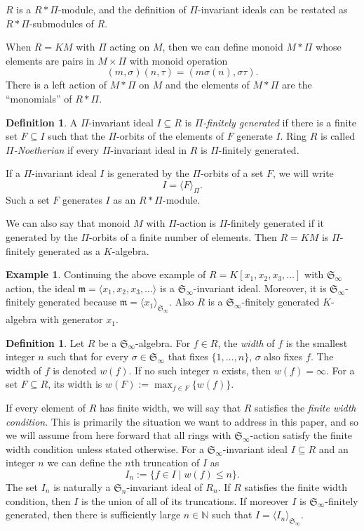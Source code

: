 \documentclass{amsart}
\theoremstyle{definition}
\newtheorem{definition}[theorem]{Definition}
\newtheorem{example}[theorem]{Example}
\theoremstyle{remark}
\numberwithin{equation}{section}
\newcommand{\B}[1]{\mathbb #1}
\newcommand{\F}[1]{\mathfrak #1}
\newcommand{\ideal}[1]{\langle #1 \rangle}
\newcommand{\SymN}{\F S_\infty}
\newcommand{\mon}{M}
\newcommand{\Sym}{\F S_\infty}
\begin{document}
$R$ is a $R*\Pi$-module, and the definition of $\Pi$-invariant ideals can be restated as $R*\Pi$-submodules of $R$.

When $R = K\mon$ with $\Pi$ acting on $\mon$, then we can define monoid $\mon *\Pi$ whose elements are pairs in $\mon \times \Pi$ with monoid operation
 \[ (m, \sigma)(n, \tau) = (m\sigma(n), \sigma\tau). \]
There is a left action of $\mon*\Pi$ on $\mon$ and the elements of $\mon *\Pi$ are the ``monomials'' of $R*\Pi$.

\begin{definition}
 A $\Pi$-invariant ideal $I \subseteq R$ is {\em $\Pi$-finitely generated} if there is a finite set $F \subseteq I$ such that the $\Pi$-orbits of the elements of $F$ generate $I$.  Ring $R$ is called {\em $\Pi$-Noetherian} if every $\Pi$-invariant ideal in $R$ is $\Pi$-finitely generated.
\end{definition}
If a $\Pi$-invariant ideal $I$ is generated by the $\Pi$-orbits of a set $F$, we will write
 \[ I = \ideal{F}_{\Pi}. \]
Such a set $F$ generates $I$ as an $R*\Pi$-module.

We can also say that monoid $\mon$ with $\Pi$-action is $\Pi$-finitely generated if it generated by the $\Pi$-orbits of a finite number of elements.  Then $R = K\mon$ is $\Pi$-finitely generated as a $K$-algebra.

\begin{example}
 Continuing the above example of $R = K[x_1,x_2,x_3,\ldots]$ with $\SymN$ action, the ideal $\F m = \ideal{x_1,x_2,x_3,\ldots}$ is a $\SymN$-invariant ideal.  Moreover, it is $\SymN$-finitely generated because $\F m = \ideal{x_1}_{\SymN}$.  Also $R$ is a $\SymN$-finitely generated $K$-algebra with generator $x_1$.
\end{example}
 

\begin{definition}
 Let $R$ be a $\SymN$-algebra.  For $f \in R$, the {\em width} of $f$ is the smallest integer $n$ such that for every $\sigma \in \SymN$ that fixes $\{1,\ldots,n\}$, $\sigma$ also fixes $f$.  The width of $f$ is denoted $w(f)$.  If no such integer $n$ exists, then $w(f) = \infty$.  For a set $F \subseteq R$, its width is $w(F) := \max_{f \in F}\{w(f)\}$.
\end{definition}
If every element of $R$ has finite width, we will say that $R$ satisfies the {\em finite width condition}.  This is primarily the situation we want to address in this paper, and so we will assume from here forward that all rings with $\Sym$-action satisfy the finite width condition unless stated otherwise.  For a $\SymN$-invariant ideal $I \subseteq R$ and an integer $n$ we can define the $n$th truncation of $I$ as
 \[ I_n := \{ f \in I \mid w(f) \leq n \}. \]
The set $I_n$ is naturally a $\F S_n$-invariant ideal of $R_n$.  If $R$ satisfies the finite width condition, then $I$ is the union of all of its truncations.  If moreover $I$ is $\SymN$-finitely generated, then there is sufficiently large $n \in \B N$ such that $I = \ideal{I_n}_{\SymN}$.
\end{document}
